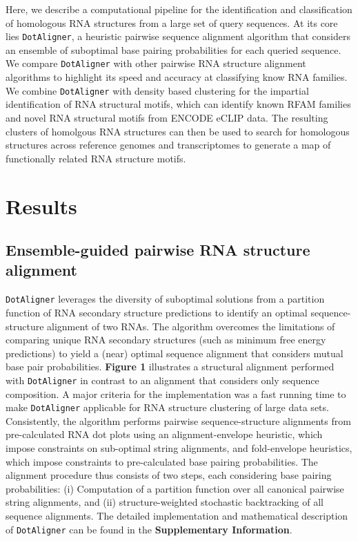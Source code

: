 \documentclass{bmcart}
\newcommand\dotaligner{\texttt{DotAligner}}
\begin{document}
Here, we describe a computational pipeline for the identification and classification of
homologous RNA structures from a large set of query sequences. At its core lies \dotaligner{}, a
heuristic pairwise sequence alignment algorithm that considers an ensemble of suboptimal 
base pairing probabilities for each queried sequence. We compare \dotaligner{} with other pairwise RNA structure alignment algorithms to highlight its speed and accuracy at classifying know RNA families. 
We combine \dotaligner{} with density based clustering for the impartial identification of 
RNA structural motifs, which can identify known RFAM families and novel RNA structural 
motifs from ENCODE eCLIP data. The resulting clusters of homolgous RNA structures can then 
be used to search for homologous structures across reference genomes and transcriptomes 
to generate a map of functionally related RNA structure motifs.  


\section*{Results}
\subsection*{Ensemble-guided pairwise RNA structure alignment} 
 
\dotaligner{} leverages the diversity of  suboptimal solutions from a partition function of RNA secondary structure predictions to identify an optimal sequence-structure alignment of two RNAs. 
The algorithm overcomes the limitations of comparing unique RNA 
secondary structures (such as minimum free energy predictions) to yield 
a (near) optimal sequence alignment that considers mutual base pair probabilities.
\textbf{Figure 1} illustrates a structural alignment performed with \dotaligner{}
in contrast to an alignment that considers only sequence composition.
A major criteria for the implementation was a fast running time to make 
\dotaligner{}  applicable for RNA structure clustering of large data sets.
Consistently, the algorithm performs pairwise sequence-structure alignments from 
pre-calculated RNA dot plots using an alignment-envelope heuristic, which 
impose constraints on sub-optimal string alignments, and fold-envelope 
heuristics, which impose constraints to pre-calculated base pairing probabilities.
The alignment procedure thus consists of two steps, each considering base pairing  
probabilities: (i) Computation of a partition function over all canonical pairwise 
string alignments, and (ii) structure-weighted stochastic backtracking of 
all sequence alignments. The detailed implementation and mathematical description 
of \dotaligner{} can be found  in the \textbf{Supplementary Information}.\\
\end{document}
